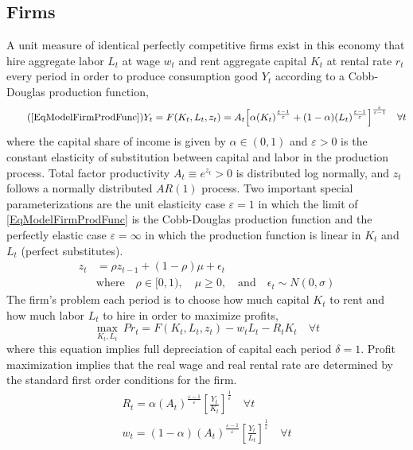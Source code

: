 \documentclass[letterpaper,12pt]{article}
\theoremstyle{definition}
\newcommand\ve{\varepsilon}
\begin{document}
  \subsection{Firms}

    A unit measure of identical perfectly competitive firms exist in this economy that hire aggregate labor $L_t$ at wage $w_t$ and rent aggregate capital $K_t$ at rental rate $r_t$ every period in order to produce consumption good $Y_t$ according to a Cobb-Douglas production function,
    \begin{equation}\tag{\ref{EqModelFirmProdFunc}}
       Y_t = F(K_t, L_t, z_t) = A_t\Bigl[\alpha(K_t)^\frac{\ve-1}{\ve} + (1 - \alpha)(L_t)^\frac{\ve-1}{\ve}\Bigr]^\frac{\ve}{\ve-1} \quad\forall t
    \end{equation}
    where the capital share of income is given by $\alpha\in(0,1)$ and $\ve>0$ is the constant elasticity of substitution between capital and labor in the production process. Total factor productivity $A_t \equiv e^{z_t}>0$ is distributed log normally, and $z_t$ follows a normally distributed $AR(1)$ process. Two important special parameterizations are the unit elasticity case $\ve=1$ in which the limit of \eqref{EqModelFirmProdFunc} is the Cobb-Douglas production function and the perfectly elastic case $\ve=\infty$ in which the production function is linear in $K_t$ and $L_t$ (perfect substitutes).
    \begin{equation}\label{EqModelFirmZAR1}
      \begin{split}
        z_t &= \rho z_{t-1} + (1-\rho)\mu + \epsilon_t \\
        &\text{where}\quad \rho\in[0,1),\quad\mu\geq 0, \quad\text{and}\quad \epsilon_t \sim N(0,\sigma)
      \end{split}
    \end{equation}
    The firm's problem each period is to choose how much capital $K_t$ to rent and how much labor $L_t$ to hire in order to maximize profits,
    \begin{equation}\label{EqModelFirmProfMax}
      \max_{K_t, L_t}\:Pr_t = F(K_t, L_t, z_t) - w_t L_t - R_t K_t \quad\forall t
    \end{equation}
    where this equation implies full depreciation of capital each period $\delta=1$. Profit maximization implies that the real wage and real rental rate are determined by the standard first order conditions for the firm.
    \begin{gather}
      R_t = \alpha(A_t)^\frac{\ve-1}{\ve}\left[\frac{Y_t}{K_t}\right]^\frac{1}{\ve} \quad\forall t \label{EqModelFirm_FOCK} \\
      w_t = (1 - \alpha)(A_t)^\frac{\ve-1}{\ve}\left[\frac{Y_t}{L_t}\right]^\frac{1}{\ve} \quad\forall t \label{EqModelFirm_FOCL}
    \end{gather}
\end{document}
